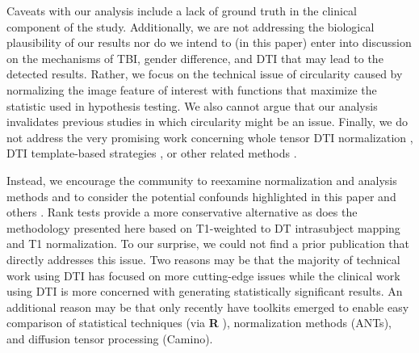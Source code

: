 \documentclass[final,5p,times,twocolumn]{elsarticle}
\begin{document}
Caveats with our analysis include a lack of ground truth in the
clinical component of the study.   Additionally, we are not addressing
the biological plausibility of our results nor do we
intend to (in this paper) enter into discussion on the mechanisms of
TBI, gender difference, and DTI that may lead to the detected results.
Rather, we focus on the technical issue of circularity caused by
normalizing the image feature of interest with functions that maximize
the statistic used in hypothesis testing.  We also cannot argue that our analysis
invalidates previous studies in which circularity might be an issue.  
Finally, we do not address the very promising work concerning
whole tensor DTI normalization \citep{Zhang2007,Hecke2007}, DTI template-based
strategies \citep{Mori2009,Hecke2011}, or other related methods \citep{jbabdi2010}.  

Instead, we encourage the community to
reexamine normalization and analysis methods and to consider the
potential confounds highlighted in this paper and others
\citep{Ridgway2008}.  Rank tests
provide a more conservative alternative as does the methodology
presented here based on T1-weighted to DT intrasubject mapping and T1
normalization.  To our surprise, we could not find a prior publication that directly
addresses this issue.  Two reasons may be that the majority of
technical work using DTI has focused on more cutting-edge issues while
the clinical work using DTI is more concerned with generating
statistically significant results.  An additional reason may be that
only recently have toolkits emerged to enable easy comparison of
statistical techniques (via {\bf R} \citep{RDevelopmentCoreTeam2011}), normalization methods (ANTs), and
diffusion tensor processing (Camino).




\end{document}
